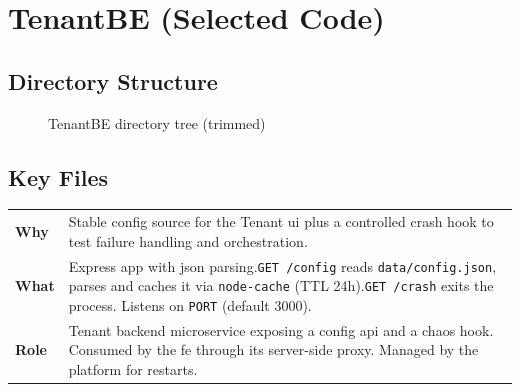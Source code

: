 \documentclass[11pt, a4paper, oneside, listof=totoc]{scrartcl}
\makeatletter
\newcommand{\codesummary}[3]{%
    \vspace{0.4\baselineskip}%
    \noindent\begin{tabularx}{\linewidth}{@{}>{\bfseries}l X@{}}
    Why  & #1\\
    What & #2\\
    Role & #3\\
    \end{tabularx}%
    \vspace{0.2\baselineskip}%
}
\makeatother
\begin{document}
        \clearpage

        \section{TenantBE (Selected Code)}\label{app:tenantbe}
            \subsection{Directory Structure}
            \begin{figure}[H]
                \centering
                \caption{TenantBE directory tree (trimmed)}\label{fig:tenantbe-tree}
            \end{figure}

        \clearpage

            \subsection{Key Files}
                \codesummary
                    {Stable config source for the Tenant \gls{ui} plus a controlled crash hook to test failure handling and orchestration.}
                    {Express app with \gls{json} parsing.\@\texttt{GET /config} reads \texttt{data/config.json}, parses and caches it via \texttt{node-cache} (TTL 24h).\@\texttt{GET /crash} exits the process. Listens on \texttt{PORT} (default 3000).}
                    {Tenant backend microservice exposing a config \gls{api} and a chaos hook. Consumed by the \gls{fe} through its server-side proxy. Managed by the platform for restarts.}

        \clearpage
\end{document}
